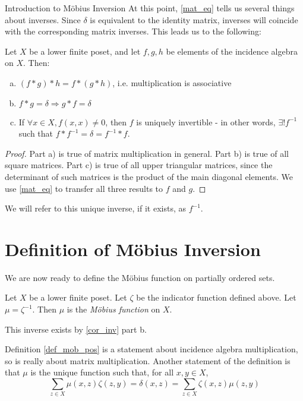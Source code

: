 \documentclass[12pt]{pom_thesis}
\begin{document}
\begin{chapter}{Introduction to M\"obius Inversion}
At this point, \ref{mat_eq} tells us several things about inverses. Since $\delta$ is equivalent to the identity matrix, inverses will coincide with the corresponding matrix inverses. This leads us to the following:
\begin{cor}\label{cor_inv}
Let $X$ be a lower finite poset, and let $f,g, h$ be elements of the incidence algebra on $X$. Then:
\begin{enumerate}[a)]
\item $(f*g)*h = f*(g*h)$, i.e. multiplication is associative
\item $f*g = \delta \Rightarrow g*f = \delta$
\item If $\forall x \in X, f(x,x) \neq 0$, then $f$ is uniquely invertible - in other words, $\exists! f^{-1}$ such that $f*f^{-1} = \delta = f^{-1} * f$.
\end{enumerate}
\end{cor}
\begin{proof}
Part a) is true of matrix multiplication in general. Part b) is true of all square matrices. Part c) is true of all upper triangular matrices, since the determinant of such matrices is the product of the main diagonal elements. We use \ref{mat_eq} to transfer all three results to $f$ and $g$.
\end{proof}
We will refer to this unique inverse, if it exists, as $f^{-1}$. 


\section{Definition of M\"obius Inversion}
We are now ready to define the M\"obius function on partially ordered sets.
\begin{defn}\label{def_mob_pos}
Let $X$ be a lower finite poset. Let $\zeta$ be the indicator function defined above. Let $\mu = \zeta^{-1}$. Then $\mu$ is the \emph{M\"obius function} on $X$.
\end{defn}
\begin{rmk}
This inverse exists by \ref{cor_inv} part b. 
\end{rmk}
\begin{rmk}\label{sum_form}
Definition \ref{def_mob_pos} is a statement about incidence algebra multiplication, so is really about matrix multiplication. Another statement of the definition is that $\mu$ is the unique function such that, for all $x,y \in X$,
\[
\sum_{z \in X} \mu(x,z)\zeta(z,y) = \delta(x,z) = \sum_{z \in X} \zeta(x,z)\mu(z,y)
\]
\end{rmk}


\end{chapter}
\end{document}

